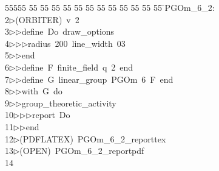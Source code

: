 %
%
\begin{tabbing}
55555 \= 55 \= 55 \= 55 \= 55 \= 55 \= 55 \= 55 \= 55 \= 55 \= 55 \= 55 \= 55 \= \>PGOm\_6\_2:\\[0pt]
2\>$\triangleright$\>(ORBITER)\ v\ 2\ \\[0pt]
3\>$\triangleright$\>$\triangleright$\>define\ Do\ draw\_options\ \\[0pt]
4\>$\triangleright$\>$\triangleright$\>$\triangleright$\>radius\ 200\ line\_width\ 03\ \\[0pt]
5\>$\triangleright$\>$\triangleright$\>end\ \\[0pt]
6\>$\triangleright$\>$\triangleright$\>define\ F\ finite\_field\ q\ 2\ end\ \\[0pt]
7\>$\triangleright$\>$\triangleright$\>define\ G\ linear\_group\ PGOm\ 6\ F\ end\ \\[0pt]
8\>$\triangleright$\>$\triangleright$\>with\ G\ do\ \\[0pt]
9\>$\triangleright$\>$\triangleright$\>group\_theoretic\_activity\ \\[0pt]
10\>$\triangleright$\>$\triangleright$\>$\triangleright$\>report\ Do\ \\[0pt]
11\>$\triangleright$\>$\triangleright$\>end\\[0pt]
12\>$\triangleright$\>(PDFLATEX)\ PGOm\_6\_2\_reporttex\\[0pt]
13\>$\triangleright$\>(OPEN)\ PGOm\_6\_2\_reportpdf\\[0pt]
14\>\end{tabbing}
